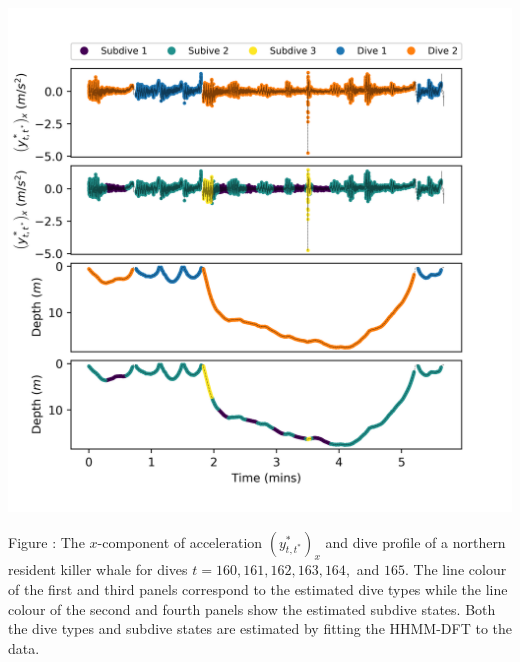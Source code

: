 \documentclass{article}
\begin{document}
        \begin{center}
        \includegraphics[width=6in]{../Plots/HHMM_decoded_dives.png}
        \end{center}
        
        \noindent Figure : The $x$-component of acceleration $\left(y^*_{t,t^*}\right)_x$ and dive profile of a northern resident killer whale for dives $t = 160,161,162,163,164,$ and $165$. The line colour of the first and third panels correspond to the estimated dive types while the line colour of the second and fourth panels show the estimated subdive states. Both the dive types and subdive states are estimated by fitting the HHMM-DFT to the data.
        \addtocounter{fignum}{1}
        
\end{document}
